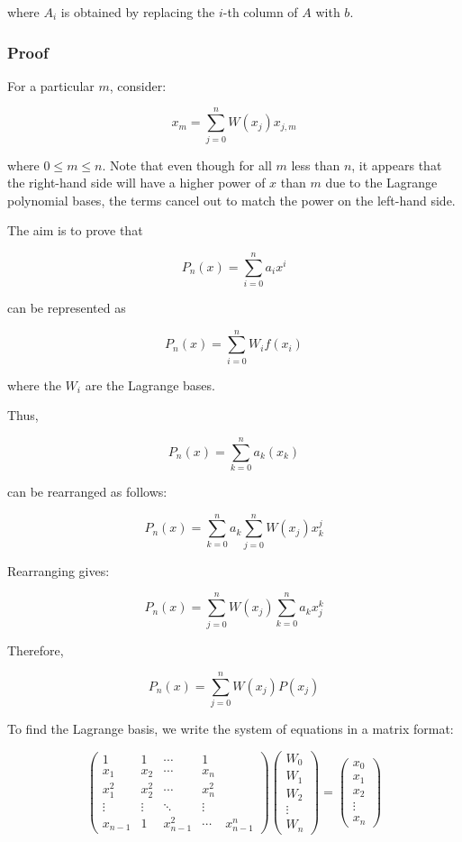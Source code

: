 \documentclass[12pt]{report} %
\begin{document}
where \( A_i \) is obtained by replacing the \( i \)-th column of \( A \) with \( b \).

\subsubsection{Proof}
For a particular \( m \), consider:

\[
x_m = \sum_{j=0}^{n} W(x_j)x_{j,m}
\]

where \( 0 \leq m \leq n \). Note that even though for all \( m \) less than \( n \), it appears that the right-hand side will have a higher power of \( x \) than \( m \) due to the Lagrange polynomial bases, the terms cancel out to match the power on the left-hand side.

The aim is to prove that 

\[
P_n(x) = \sum_{i=0}^{n} a_ix^i
\]

can be represented as 

\[
P_n(x) = \sum_{i=0}^{n} W_i f(x_i)
\]

where the \( W_i \) are the Lagrange bases.

Thus,

\[
P_n(x) = \sum_{k=0}^{n} a_k(x_k)
\]

can be rearranged as follows:

\[
P_n(x) = \sum_{k=0}^{n} a_k \sum_{j=0}^{n} W(x_j)x^j_k
\]

Rearranging gives:

\[
P_n(x) = \sum_{j=0}^{n} W(x_j) \sum_{k=0}^{n} a_k x_j^k
\]

Therefore,

\[
P_n(x) = \sum_{j=0}^{n} W(x_j) P(x_j)
\]

To find the Lagrange basis, we write the system of equations in a matrix format:

\[
\begin{pmatrix}
1 & 1 & \cdots & 1 \\
x_1 & x_2 & \cdots & x_n \\
x_1^2 & x_2^2 & \cdots & x_n^2 \\
\vdots & \vdots & \ddots & \vdots \\
x_{n-1} & 1 & x_{n-1}^2 & \cdots & x_{n-1}^n
\end{pmatrix}
\begin{pmatrix}
W_0 \\
W_1 \\
W_2 \\
\vdots \\
W_n
\end{pmatrix}
=
\begin{pmatrix}
x_0 \\
x_1 \\
x_2 \\
\vdots \\
x_n
\end{pmatrix}
\]
\end{document}

